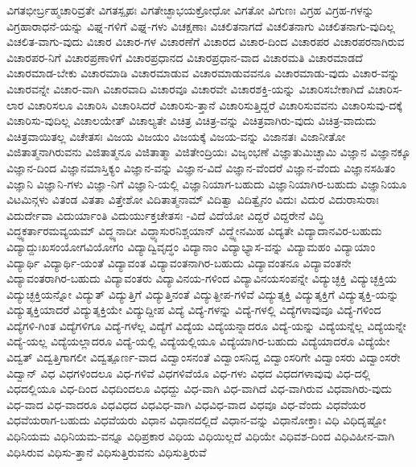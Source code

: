 {ವಿಗತಭೀರ್ಬ್ರಹ್ಮಚಾರಿವ್ರತೇ
ವಿಗತಸ್ಪೃಹಃ
ವಿಗತೇಚ್ಛಾಭಯಕ್ರೋಧೋ
ವಿಗತೋ
ವಿಗುಣಃ
ವಿಗ್ರಹ
ವಿಗ್ರಹ-ಗಳನ್ನು
ವಿಗ್ರಹಾರಾಧನೆ-ಯನ್ನು
ವಿಘ್ನ-ಗಳಿಗೆ
ವಿಘ್ನ-ಗಳು
ವಿಚಕ್ಷಣಾಃ
ವಿಚಲಿತನಾಗದೆ
ವಿಚಲಿತನಾಗು
ವಿಚಲಿತನಾಗು-ವುದಿಲ್ಲ
ವಿಚಲಿತ-ವಾಗು-ವುದು
ವಿಚಾರ
ವಿಚಾರ-ಗಳ
ವಿಚಾರಣೆಗೆ
ವಿಚಾರದ
ವಿಚಾರ-ದಿಂದ
ವಿಚಾರಪರ
ವಿಚಾರಪರನಾಗಿರುವ
ವಿಚಾರಪರ-ನಿಗೆ
ವಿಚಾರಪ್ರಣಾಳಿಗೆ
ವಿಚಾರಪ್ರಧಾನದ
ವಿಚಾರಪ್ರಧಾನ-ವಾದ
ವಿಚಾರಮತಿ
ವಿಚಾರಮಾಡದೆ
ವಿಚಾರಮಾಡ-ಬೇಕು
ವಿಚಾರಮಾಡಿ
ವಿಚಾರಮಾಡುವ
ವಿಚಾರಮಾಡುವವನೂ
ವಿಚಾರಮಾಡು-ವುದು
ವಿಚಾರ-ವನ್ನು
ವಿಚಾರವನ್ನೇ
ವಿಚಾರ-ವಾಗಿ
ವಿಚಾರವಾದಿ
ವಿಚಾರವೂ
ವಿಚಾರವೇ
ವಿಚಾರಶಕ್ತಿ-ಯನ್ನು
ವಿಚಾರಿಸಬೇಕಾಗಿದೆ
ವಿಚಾರಿಸ-ಲಾರ
ವಿಚಾರಿಸಲೂ
ವಿಚಾರಿಸಿ
ವಿಚಾರಿಸಿದರೆ
ವಿಚಾರಿಸು-ತ್ತಾನೆ
ವಿಚಾರಿಸುತ್ತಿದ್ದರೆ
ವಿಚಾರಿಸುವವನು
ವಿಚಾರಿಸುವು-ದಕ್ಕೆ
ವಿಚಾರಿಸು-ವುದಿಲ್ಲ
ವಿಚಾಲಯೇತ್
ವಿಚಾಲ್ಯತೇ
ವಿಚಿತ್ರ
ವಿಚಿತ್ರ-ವನ್ನು
ವಿಚಿತ್ರವಾಗಿರು-ವುದು
ವಿಚಿತ್ರ-ವಾದುದು
ವಿಚಿತ್ರವಾಯಿತಲ್ಲ
ವಿಚೇತಸಃ
ವಿಜಯ
ವಿಜಯಂ
ವಿಜಯಕ್ಕೆ
ವಿಜಯ-ವನ್ನು
ವಿಜಾನತಃ
ವಿಜಾನೀತೋ
ವಿಜಿತಾತ್ಮನಾಗಿರುವನು
ವಿಜಿತಾತ್ಮನೂ
ವಿಜಿತಾತ್ಮಾ
ವಿಜಿತೇಂದ್ರಿಯಃ
ವಿಜೃಂಭಣೆ
ವಿಜ್ಞಾತುಮಿಚ್ಛಾಮಿ
ವಿಜ್ಞಾನ
ವಿಜ್ಞಾನಕ್ಕೂ
ವಿಜ್ಞಾನ-ದಿಂದ
ವಿಜ್ಞಾನಮಾಸ್ತಿಕ್ಯಂ
ವಿಜ್ಞಾನ-ವನ್ನು
ವಿಜ್ಞಾನ-ವಿದೆ
ವಿಜ್ಞಾನ-ವೆಂದರೆ
ವಿಜ್ಞಾನ-ವೆಂದು
ವಿಜ್ಞಾನಸಹಿತಂ
ವಿಜ್ಞಾನಿ
ವಿಜ್ಞಾನಿ-ಗಳು
ವಿಜ್ಞಾ-ನಿಗೆ
ವಿಜ್ಞಾನಿ-ಯಲ್ಲಿ
ವಿಜ್ಞಾನಿಯಾಗ-ಬಹುದು
ವಿಜ್ಞಾನಿಯಾಗಿರ-ಬಹುದು
ವಿಜ್ಞಾನಿಯೂ
ವಿಟಮಿನ್ಗಳು
ವಿತಂಡ
ವಿತತಾ
ವಿತ್ತೇಶೋ
ವಿದಿತಾತ್ಮನಾಮ್
ವಿದಿತ್ವಾ
ವಿದಿತ್ವೈನಂ
ವಿದುಃ
ವಿದುರ
ವಿದುರಾಸುರಾಃ
ವಿದುರ್ದೇವಾ
ವಿದುರ್ಯಾಂತಿ
ವಿದುರ್ಯುಕ್ತಚೇತಸಃ
-ವಿದೆ
ವಿದೆಯೋ
ವಿದ್ದರೆ
ವಿದ್ದರೇನೆ
ವಿದ್ಧಿ
ವಿದ್ಧ್ಯಕರ್ತಾರಮವ್ಯಯಮ್
ವಿದ್ಧ್ಯನಾದೀ
ವಿದ್ಧ್ಯಾಸುರನಿಶ್ಚಯಾನ್
ವಿದ್ಧ್ಯೇನಮಿಹ
ವಿದ್ಯತೇ
ವಿದ್ಯಾದಾನವಿರ-ಬಹುದು
ವಿದ್ಯಾದ್ದುಃಖಸಂಯೋಗವಿಯೋಗಂ
ವಿದ್ಯಾದ್ವಿವೃದ್ಧಂ
ವಿದ್ಯಾನಾಂ
ವಿದ್ಯಾಭ್ಯಾಸ-ವನ್ನು
ವಿದ್ಯಾಮಹಂ
ವಿದ್ಯಾಯಾಂ
ವಿದ್ಯಾರ್ಥಿ
ವಿದ್ಯಾರ್ಥಿ-ಯಂತೆ
ವಿದ್ಯಾವಂತ
ವಿದ್ಯಾವಂತನಾಗಿರ-ಬಹುದು
ವಿದ್ಯಾವಂತನೂ
ವಿದ್ಯಾವಂತನೇ
ವಿದ್ಯಾವಂತರಾಗಿರ-ಬಹುದು
ವಿದ್ಯಾವಂತರು
ವಿದ್ಯಾವಿನಯ-ಗಳಿಂದ
ವಿದ್ಯಾವಿನಯಸಂಪನ್ನೇ
ವಿದ್ಯುಚ್ಛಕ್ತಿ
ವಿದ್ಯುಚ್ಛಕ್ತಿಯ
ವಿದ್ಯುಚ್ಛಕ್ತಿಯನ್ನೋ
ವಿದ್ಯುತ್
ವಿದ್ಯುತ್ತಿಗೆ
ವಿದ್ಯುತ್ತಿನಂತೆ
ವಿದ್ಯುತ್ದೀಪ-ಗಳಿವೆ
ವಿದ್ಯುತ್ಶಕ್ತಿ
ವಿದ್ಯುತ್ಶಕ್ತಿಗೆ
ವಿದ್ಯುತ್ಶಕ್ತಿ-ಯನ್ನು
ವಿದ್ಯುತ್ಶಕ್ತಿಯಾದರೆ
ವಿದ್ಯುತ್ಶಕ್ತಿಯೇ
ವಿದ್ಯುದ್ದೀಪ
ವಿದ್ಯೆ
ವಿದ್ಯೆ-ಗಳನ್ನು
ವಿದ್ಯೆ-ಗಳಲ್ಲಿ
ವಿದ್ಯೆಗಳಾವುವೂ
ವಿದ್ಯೆ-ಗಳಿಂದ
ವಿದ್ಯೆಗಳಿ-ಗಿಂತ
ವಿದ್ಯೆಗಳಿಗೂ
ವಿದ್ಯೆ-ಗಳೆಲ್ಲ
ವಿದ್ಯೆಗೆ
ವಿದ್ಯೆಯ
ವಿದ್ಯೆಯನ್ನಾದರೂ
ವಿದ್ಯೆ-ಯನ್ನು
ವಿದ್ಯೆಯನ್ನೆಲ್ಲ
ವಿದ್ಯೆಯನ್ನೇ
ವಿದ್ಯೆ-ಯಲ್ಲ
ವಿದ್ಯೆಯಲ್ಲಾದರೂ
ವಿದ್ಯೆ-ಯಲ್ಲಿ
ವಿದ್ಯೆಯಲ್ಲಿಯೂ
ವಿದ್ಯೆಯಾಗಿರ-ಬಹುದು
ವಿದ್ಯೆಯಾದರೊ
ವಿದ್ಯೆಯೇ
ವಿದ್ವತ್
ವಿದ್ವತ್ತಿಗಾಗಲೀ
ವಿದ್ವತ್ಪೂರ್ಣ-ವಾದ
ವಿದ್ವಾಂಸನಂತೆ
ವಿದ್ವಾಂಸನಿದ್ದ
ವಿದ್ವಾಂಸರಿಗೇ
ವಿದ್ವಾಂಸರು
ವಿದ್ವಾಂಸರೇ
ವಿದ್ವಾನ್
ವಿಧ
ವಿಧಗಳಿಂದಲೂ
ವಿಧ-ಗಳಿವೆ
ವಿಧಗಳಿವೆಯೊ
ವಿಧ-ಗಳು
ವಿಧದ
ವಿಧದಗಳಾವುವು
ವಿಧ-ದಲ್ಲಿ
ವಿಧದಲ್ಲಿಯೂ
ವಿಧ-ದಿಂದ
ವಿಧದಿಂದಲೂ
ವಿಧದ್ದು
ವಿಧ-ವಾಗಿ
ವಿಧ-ವಾಗಿದೆ
ವಿಧ-ವಾಗಿರುವ
ವಿಧವಾಗಿರು-ವುದು
ವಿಧ-ವಾದ
ವಿಧ-ವಾದರೂ
ವಿಧವಿಧದ
ವಿಧವಿಧ-ವಾಗಿ
ವಿಧವಿಧ-ವಾದ
ವಿಧವೂ
ವಿಧ-ವೆಂದು
ವಿಧವೆಯರ
ವಿಧವೆಯರಾಗ-ಬಹುದು
ವಿಧವೆಯರು
ವಿಧಾನ
ವಿಧಾನದಲ್ಲಿದೆ
ವಿಧಾನ-ವನ್ನು
ವಿಧಾನೋಕ್ತಾಃ
ವಿಧಿ
ವಿಧಿದೃಷ್ಟೋ
ವಿಧಿನಿಯಮ
ವಿಧಿನಿಯಮ-ವನ್ನೂ
ವಿಧಿಪ್ರಕಾರ
ವಿಧಿಯ
ವಿಧಿಯಿಲ್ಲದೆ
ವಿಧಿಯೇ
ವಿಧಿವಶ-ದಿಂದ
ವಿಧಿವಿಹೀನ-ವಾಗಿ
ವಿಧಿಸಿರುವ
ವಿಧಿಸು-ತ್ತಾನೆ
ವಿಧಿಸುತ್ತಿರುವನು
ವಿಧಿಸುತ್ತಿರುವೆ
}
